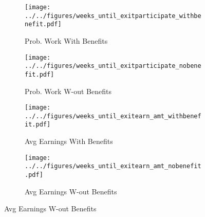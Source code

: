 \documentclass{beamer}
\begin{document}
\begin{frame}
	\begin{figure}
		\begin{subfigure}{.42\textwidth}\centering\caption{ \footnotesize Prob. Work With Benefits}\label{map1}
		\texttt{[image: ../../figures/weeks\_until\_exitparticipate\_withbenefit.pdf]}
		\end{subfigure}
		\begin{subfigure}{.42\textwidth}\centering\caption{ \footnotesize Prob. Work W-out Benefits}\label{map2}
			\texttt{[image: ../../figures/weeks\_until\_exitparticipate\_nobenefit.pdf]}	
		\end{subfigure}
		\begin{subfigure}{.42\textwidth}\centering\caption{ \footnotesize Avg Earnings With Benefits}\label{map1}
			\texttt{[image: ../../figures/weeks\_until\_exitearn\_amt\_withbenefit.pdf]}	
		\end{subfigure}
		\begin{subfigure}{.42\textwidth}\centering\caption{\footnotesize Avg Earnings W-out Benefits }\label{map2}
			\texttt{[image: ../../figures/weeks\_until\_exitearn\_amt\_nobenefit.pdf]}	
		\end{subfigure}
	\end{figure}
\end{frame}
\end{document}
